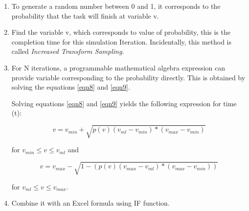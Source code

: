 \begin{enumerate}
	\item To generate a random number between 0 and 1, it corresponds to the probability that the task will finish at variable {v}.
	\item Find the variable {v}, which corresponds to value of probability, this is the completion time for this simulation Iteration. Incidentally, this method is called \emph{Increased Transform Sampling}.
	\item For N iterations, a programmable mathematical algebra expression can provide variable corresponding to the probability directly. This is obtained by solving the equations \ref{eqn8} and  \ref{eqn9}.
	
	Solving equations \ref{eqn8} and  \ref{eqn9} yields the following expression for time (t):
	
	\begin{equation}
	v = v_{min} + \sqrt{ p(v) (v_{ml} - v_{min}) * (v_{max} - v_{min})}
	\label{eqn10}
	\end{equation}
	
	for $ v_{min} \leqslant v \leqslant v_{ml}$ and 
	
	\begin{equation}
	v = v_{max} - \sqrt{1 - (p(v) (v_{max} - v_{ml}) * (v_{max} - v_{min}))}
	\label{eqn11}
	\end{equation}
	
	for $ v_{ml} \leqslant v \leqslant v_{max}$. 
	
	\item Combine it with an Excel formula using IF function.
	
\end{enumerate}




